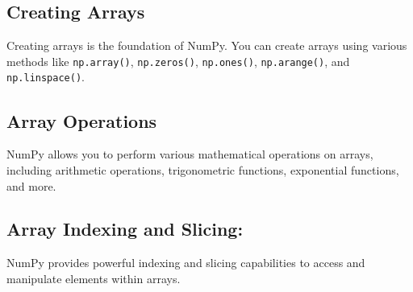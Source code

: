 \begin{code}[h!]
	    
	
	\caption{How to Import the package}
	
\end{code}

\subsection{Creating Arrays}

Creating arrays is the foundation of NumPy. You can create arrays using various methods like \texttt{np.array()}, \texttt{np.zeros()}, \texttt{np.ones()}, \texttt{np.arange()}, and \texttt{np.linspace()}.

\begin{code}[h!]
	    
	
	\caption{Creating Arrays}
	
\end{code}

\subsection{Array Operations}

NumPy allows you to perform various mathematical operations on arrays, including arithmetic operations, trigonometric functions, exponential functions, and more.

\begin{code}[h!]
	    
	
	\caption{Array Operations}
	
\end{code}

\subsection{Array Indexing and Slicing:}

NumPy provides powerful indexing and slicing capabilities to access and manipulate elements within arrays.

\begin{code}[h!]
	    
	
	\caption{Array Indexing and Slicing}
	
\end{code}

